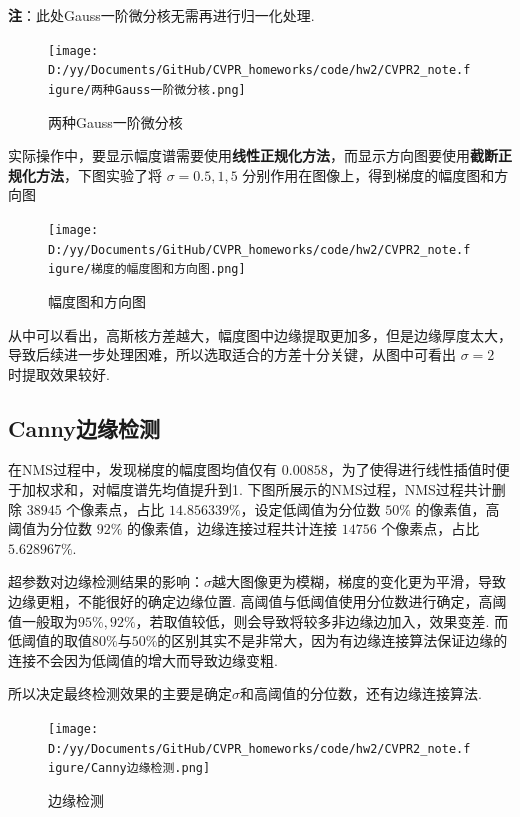 \documentclass[12pt, a4paper, oneside]{ctexart}
\numberwithin{equation}{section}  %
\begin{document}
\textbf{注}：此处Gauss一阶微分核无需再进行归一化处理.

\begin{figure}[htbp]
    \centering
    \texttt{[image: D:/yy/Documents/GitHub/CVPR\_homeworks/code/hw2/CVPR2\_note.figure/两种Gauss一阶微分核.png]}
    \caption{两种Gauss一阶微分核\label{fig-6}}
\end{figure}

实际操作中，要显示幅度谱需要使用\textbf{线性正规化方法}，而显示方向图要使用\textbf{截断正规化方法}，下图实验了将
\(\sigma=0.5, 1, 5\) 分别作用在图像上，得到梯度的幅度图和方向图

\begin{figure}[htbp]
    \centering
    \hspace*{-1.5cm}
    \texttt{[image: D:/yy/Documents/GitHub/CVPR\_homeworks/code/hw2/CVPR2\_note.figure/梯度的幅度图和方向图.png]}
    \caption{幅度图和方向图\label{fig-7}}
\end{figure}

从中可以看出，高斯核方差越大，幅度图中边缘提取更加多，但是边缘厚度太大，导致后续进一步处理困难，所以选取适合的方差十分关键，从图中可看出
\(\sigma=2\) 时提取效果较好.

\subsection{Canny边缘检测}
在NMS过程中，发现梯度的幅度图均值仅有
\(0.00858\)，为了使得进行线性插值时便于加权求和，对幅度谱先均值提升到1.
下图所展示的NMS过程，NMS过程共计删除 \(38945\) 个像素点，占比
\(14.856339\%\)，设定低阈值为分位数 \(50\%\) 的像素值，高阈值为分位数
\(92\%\) 的像素值，边缘连接过程共计连接 \(14756\) 个像素点，占比
\(5.628967\%\).

超参数对边缘检测结果的影响：$\sigma$越大图像更为模糊，梯度的变化更为平滑，导致边缘更粗，不能很好的确定边缘位置. 高阈值与低阈值使用分位数进行确定，高阈值一般取为$95\%,92\%$，若取值较低，则会导致将较多非边缘边加入，效果变差. 而低阈值的取值$80\%$与$50\%$的区别其实不是非常大，因为有边缘连接算法保证边缘的连接不会因为低阈值的增大而导致边缘变粗.

所以决定最终检测效果的主要是确定$\sigma$和高阈值的分位数，还有边缘连接算法.

\begin{figure}[htbp]
    \centering
    \texttt{[image: D:/yy/Documents/GitHub/CVPR\_homeworks/code/hw2/CVPR2\_note.figure/Canny边缘检测.png]}
    \caption{边缘检测\label{fig-8}}
\end{figure}
\vspace*{-1cm}
\end{document}
